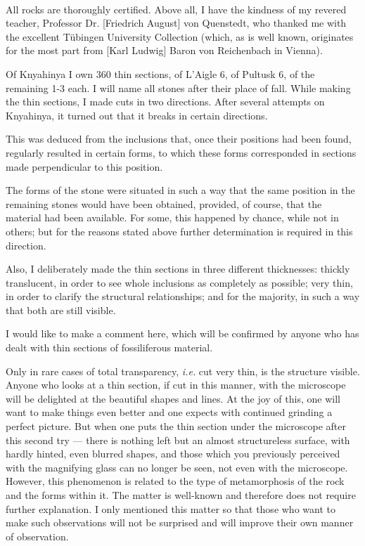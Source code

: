 \documentclass[a4paper, 12pt, oneside]{article}
\begin{document}
\paragraph*{}
All rocks are thoroughly certified. Above all, I have the kindness of my revered teacher, Professor Dr. [Friedrich August] von Quenstedt, who thanked me with the excellent Tübingen University Collection (which, as is well known, originates for the most part from [Karl Ludwig] Baron von Reichenbach in Vienna).

Of Knyahinya I own 360 thin sections, of L'Aigle 6, of Pultusk 6, of the remaining 1-3 each. I will name all stones after their place of fall. While making the thin sections, I made cuts in two directions. After several attempts on Knyahinya, it turned out that it breaks in certain directions.

This was deduced from the inclusions that, once their positions had been found, regularly resulted in certain forms, to which these forms corresponded in sections made perpendicular to this position.

The forms of the stone were situated in such a way that the same position in the remaining stones would have been obtained, provided, of course, that the material had been available. For some, this happened by chance, while not in others; but for the reasons stated above further determination is required in this direction.

Also, I deliberately made the thin sections in three different thicknesses: thickly translucent, in order to see whole inclusions as completely as possible; very thin, in order to clarify the structural relationships; and for the majority, in such a way that both are still visible.

I would like to make a comment here, which will be confirmed by anyone who has dealt with thin sections of fossiliferous material.

Only in rare cases of total transparency, \emph{i.e.} cut very thin, is the structure visible. Anyone who looks at a thin section, if cut in this manner, with the microscope will be delighted at the beautiful shapes and lines. At the joy of this, one will want to make things even better and one expects with continued grinding a perfect picture. But when one puts the thin section under the microscope after this second try --- there is nothing left but an almost structureless surface, with hardly hinted, even blurred shapes, and those which you previously perceived with the magnifying glass can no longer be seen, not even with the microscope. However, this phenomenon is related to the type of metamorphosis of the rock and the forms within it. The matter is well-known and therefore does not require further explanation. I only mentioned this matter so that those who want to make such observations will not be surprised and will improve their own manner of observation.
\end{document}

